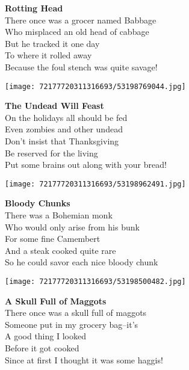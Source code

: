 \documentclass[10pt,letterpaper]{article}
\begin{document}
\begin{center}
\textbf{Rotting Head}\\
\vskip 0.2in
There once was a grocer named Babbage\\
Who misplaced an old head of cabbage\\
But he tracked it one day\\
To where it rolled away\\
Because the foul stench was quite savage!\\
\end{center}
\pagebreak

\begin{center}\texttt{[image: 72177720311316693/53198769044.jpg]}
\end{center}
\begin{center}
\textbf{The Undead Will Feast}\\
\vskip 0.2in
On the holidays all should be fed\\
Even zombies and other undead\\
Don't insist that Thanksgiving\\
Be reserved for the living\\
Put some brains out along with your bread!\\
\end{center}
\pagebreak

\begin{center}\texttt{[image: 72177720311316693/53198962491.jpg]}
\end{center}
\begin{center}
\textbf{Bloody Chunks}\\
\vskip 0.2in
There was a Bohemian monk\\
Who would only arise from his bunk\\
For some fine Camembert\\
And a steak cooked quite rare\\
So he could savor each nice bloody chunk\\
\end{center}
\pagebreak

\begin{center}
\texttt{[image: 72177720311316693/53198500482.jpg]}
\end{center}

\begin{center}
\textbf{A Skull Full of Maggots}\\
\vskip 0.2in
There once was a skull full of maggots\\
Someone put in my grocery bag--it's\\
A good thing I looked\\
Before it got cooked\\
Since at first I thought it was some haggis!\\
\end{center}
\pagebreak
\end{document}
